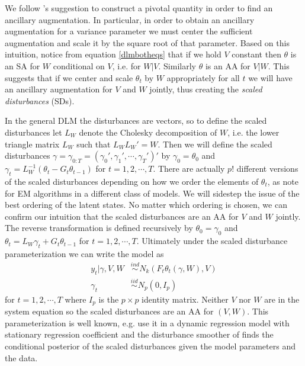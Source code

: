 \documentclass{article}
\begin{document}
We follow 's suggestion to construct a pivotal quantity in order to find an ancillary augmentation. In particular, in order to obtain an ancillary augmentation for a variance parameter we must center the sufficient augmentation and scale it by the square root of that parameter. Based on this intuition, notice from equation \eqref{dlmbotheqs} that if we hold $V$ constant then $\theta$ is an SA for $W$ conditional on $V$, i.e. for $W|V$. Similarly $\theta$ is an AA for $V|W$. This suggests that if we center and scale $\theta_{t}$ by $W$ appropriately for all $t$ we will have an ancillary augmentation for $V$ and $W$ jointly, thus creating the {\it scaled disturbances} (SDs).

In the general DLM the disturbances are vectors, so to define the scaled disturbances let $L_W$ denote the Cholesky decomposition of $W$, i.e. the lower triangle matrix $L_W$ such that $L_WL_W' =W$. Then we will define the scaled disturbances $\gamma=\gamma_{0:T}=(\gamma_0',\gamma_1',\cdots,\gamma_T')'$ by $\gamma_0=\theta_0$ and $\gamma_t = L_W^{-1}(\theta_t-G_t\theta_{t-1})$ for $t=1,2,\cdots,T$. There are actually $p!$ different versions of the scaled disturbances depending on how we order the elements of $\theta_t$, as  note for EM algorithms in a different class of models. We will sidestep the issue of the best ordering of the latent states. No matter which ordering is chosen, we can confirm our intuition that the scaled disturbances are an AA for $V$ and $W$ jointly. The reverse transformation is defined recursively by $\theta_0=\gamma_0$ and $\theta_t=L_W\gamma_t + G_t\theta_{t-1}$ for $t=1,2,\cdots,T$. Ultimately under the scaled disturbance parameterization we can write the model as
\begin{align}
  y_t|\gamma,V,W & \stackrel{ind}{\sim} N_k\left(F_t\theta_t(\gamma,W), V\right)\nonumber\\
  \gamma_t & \stackrel{iid}{\sim}N_p(0,I_p) \label{dlmdistmodel}
\end{align}
for $t=1,2,\cdots,T$ where $I_p$ is the $p\times p$ identity matrix. Neither $V$ nor $W$ are in the system equation so the scaled disturbances are an AA for $(V,W)$. This parameterization is well known, e.g.  use it in a dynamic regression model with stationary regression coefficient and the disturbance smoother of  finds the conditional posterior of the scaled disturbances given the model parameters and the data. 
\end{document}
